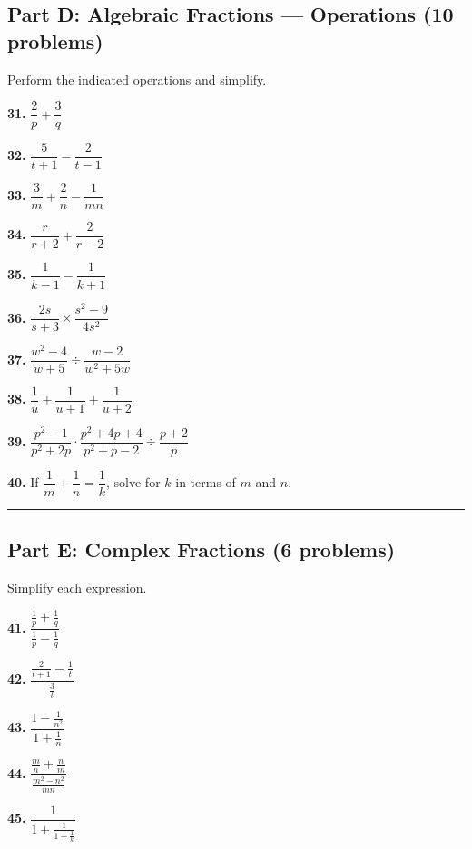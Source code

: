 \documentclass[
  11pt,
]{article}
\begin{document}
\hypertarget{part-d-algebraic-fractions-operations-10-problems}{%
\subsection{Part D: Algebraic Fractions --- Operations (10
problems)}\label{part-d-algebraic-fractions-operations-10-problems}}

Perform the indicated operations and simplify.

\textbf{31.} \(\dfrac{2}{p} + \dfrac{3}{q}\)

\textbf{32.} \(\dfrac{5}{t+1} - \dfrac{2}{t-1}\)

\textbf{33.} \(\dfrac{3}{m} + \dfrac{2}{n} - \dfrac{1}{mn}\)

\textbf{34.} \(\dfrac{r}{r+2} + \dfrac{2}{r-2}\)

\textbf{35.} \(\dfrac{1}{k-1} - \dfrac{1}{k+1}\)

\textbf{36.} \(\dfrac{2s}{s+3} \times \dfrac{s^2 - 9}{4s^2}\)

\textbf{37.} \(\dfrac{w^2 - 4}{w + 5} \div \dfrac{w - 2}{w^2 + 5w}\)

\textbf{38.} \(\dfrac{1}{u} + \dfrac{1}{u+1} + \dfrac{1}{u+2}\)

\textbf{39.}
\(\dfrac{p^2 - 1}{p^2 + 2p} \cdot \dfrac{p^2 + 4p + 4}{p^2 + p - 2} \div \dfrac{p + 2}{p}\)

\textbf{40.} If \(\dfrac{1}{m} + \dfrac{1}{n} = \dfrac{1}{k}\), solve
for \(k\) in terms of \(m\) and \(n\).

\begin{center}\rule{0.5\linewidth}{0.5pt}\end{center}

\hypertarget{part-e-complex-fractions-6-problems}{%
\subsection{Part E: Complex Fractions (6
problems)}\label{part-e-complex-fractions-6-problems}}

Simplify each expression.

\textbf{41.}
\(\dfrac{\frac{1}{p} + \frac{1}{q}}{\frac{1}{p} - \frac{1}{q}}\)

\textbf{42.} \(\dfrac{\frac{2}{t+1} - \frac{1}{t}}{\frac{3}{t}}\)

\textbf{43.} \(\dfrac{1 - \frac{1}{n^2}}{1 + \frac{1}{n}}\)

\textbf{44.} \(\dfrac{\frac{m}{n} + \frac{n}{m}}{\frac{m^2 - n^2}{mn}}\)

\textbf{45.} \(\dfrac{1}{1 + \frac{1}{1 + \frac{1}{k}}}\)
\end{document}
